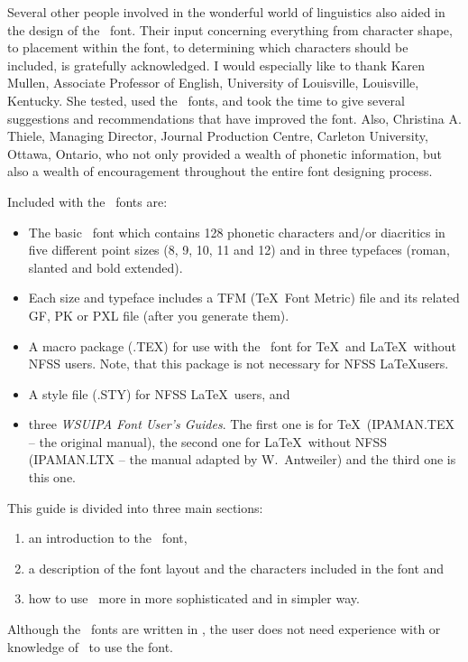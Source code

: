Several other people involved in the wonderful world of linguistics
also aided in the design of the \wsu\ font. Their input concerning
everything from character shape, to placement within the font, to
determining which characters should be included, is gratefully
acknowledged. I would especially like to thank Karen Mullen, Associate
Professor of English, University of Louisville, Louisville, Kentucky.
She tested, used the \wsu\ fonts, and took the time to give several
suggestions and recommendations that have improved the font. Also,
Christina A. Thiele, Managing Director, Journal Production Centre,
Carleton University, Ottawa, Ontario, who not only provided a wealth
of phonetic information, but also a wealth of encouragement throughout
the entire font designing process.

Included with the \wsu\ fonts are:
%
\begin{itemize}
  \item The basic \wsu\ font which contains 128 phonetic characters
and/or diacritics in five different point sizes (8, 9, 10, 11 and 12)
and in three typefaces (roman, slanted and bold extended).
  \item Each size and typeface includes a TFM (\TeX\ Font Metric) file
and its related GF, PK or PXL file (after you generate them).
  \item A macro package (\ipam.TEX) for use with the \wsu\ font for
\TeX\ and \LaTeX\ without NFSS users. Note, that this package is not
necessary for NFSS \LaTeX users.
  \item A style file (\ipas.STY) for NFSS \LaTeX\ users, and
  \item three {\em WSUIPA Font User's Guides}. The first one is for
\TeX\ ({\small\rm IPAMAN.TEX} -- the original manual), the second one
for \LaTeX\ without NFSS ({\small\rm IPAMAN.LTX} -- the manual adapted
by W.~Antweiler) and the third one is this one.
\end{itemize}

This guide is divided into three main sections:
%
\begin{enumerate}
  \item an introduction to the \wsu\ font,
  \item a description of the font layout and the characters included
in the font and
  \item how to use \ipas\ more in more sophisticated and in simpler
way.
\end{enumerate}

Although the \wsu\ fonts are written in \MF, the user does not need
experience with or knowledge of \MF\ to use the font.


